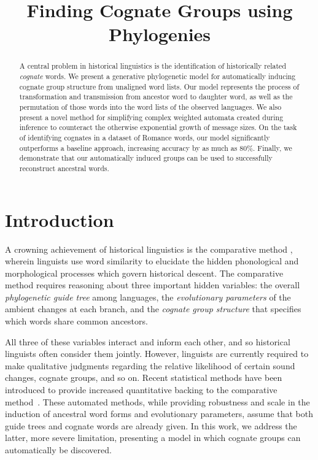 \documentclass[11pt,a4paper]{article}
\title{Finding Cognate Groups using Phylogenies}
\author{}
\date{}
\begin{document}
\maketitle
\begin{abstract}
  A central problem in historical linguistics is the identification
  of historically related \emph{cognate} words.  We present a
  generative phylogenetic model for automatically inducing cognate
  group structure from unaligned word lists. Our model represents
  the process of transformation and transmission from ancestor word
  to daughter word, as well as the permutation of those words into
  the word lists of the observed languages. We also present a novel
  method for simplifying complex weighted automata created during
  inference to counteract the otherwise exponential growth of message
  sizes. On the task of identifying cognates in a dataset of Romance
  words, our model significantly outperforms a baseline approach,
  increasing accuracy by as much as 80\%. Finally, we demonstrate
  that our automatically induced groups can be used to successfully
  reconstruct ancestral words.
\end{abstract}
\section{Introduction}

A crowning achievement of historical linguistics is the comparative
method \cite{ohala93phonetics}, wherein linguists use word similarity
to elucidate the hidden phonological and morphological processes
which govern historical descent. The comparative method requires
reasoning about three important hidden variables: the overall
\emph{phylogenetic guide tree} among languages, the \emph{evolutionary
parameters} of the ambient changes at each branch, and the \emph{cognate
group structure} that specifies which words share common ancestors.

All three of these variables interact and inform each other, and
so historical linguists often consider them jointly.  However,
linguists are currently required to make qualitative judgments
regarding the relative likelihood of certain sound changes, cognate
groups, and so on.  Recent statistical methods have been introduced
to provide increased quantitative backing to the comparative
method~\cite{oakes00computer,bouchard07probabilistic,bouchard09improved}.
These automated methods, while providing robustness and scale in
the induction of ancestral word forms and evolutionary parameters,
assume that both guide trees and cognate words are already given.
In this work, we address the latter, more severe limitation,
presenting a model in which cognate groups can automatically be
discovered.
\end{document}
